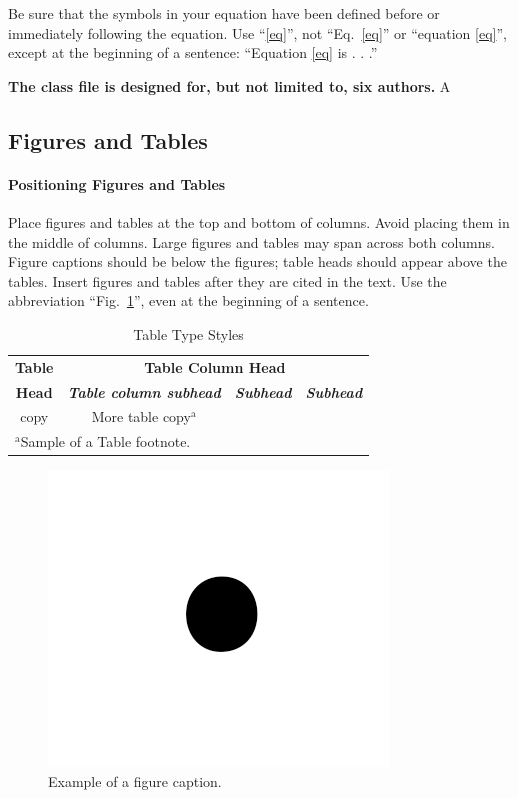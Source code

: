 \documentclass[conference]{IEEEtran}
\begin{document}
Be sure that the 
symbols in your equation have been defined before or immediately following 
the equation. Use ``\eqref{eq}'', not ``Eq.~\eqref{eq}'' or ``equation \eqref{eq}'', except at 
the beginning of a sentence: ``Equation \eqref{eq} is . . .''


\textbf{The class file is designed for, but not limited to, six authors.} A 

\subsection{Figures and Tables}
\paragraph{Positioning Figures and Tables} Place figures and tables at the top and 
bottom of columns. Avoid placing them in the middle of columns. Large 
figures and tables may span across both columns. Figure captions should be 
below the figures; table heads should appear above the tables. Insert 
figures and tables after they are cited in the text. Use the abbreviation 
``Fig.~\ref{fig}'', even at the beginning of a sentence.

\begin{table}[htbp]
\caption{Table Type Styles}
\begin{center}
\begin{tabular}{|c|c|c|c|}
\hline
\textbf{Table}&\multicolumn{3}{|c|}{\textbf{Table Column Head}} \\
\cline{2-4} 
\textbf{Head} & \textbf{\textit{Table column subhead}}& \textbf{\textit{Subhead}}& \textbf{\textit{Subhead}} \\
\hline
copy& More table copy$^{\mathrm{a}}$& &  \\
\hline
\multicolumn{4}{l}{$^{\mathrm{a}}$Sample of a Table footnote.}
\end{tabular}
\label{tab2}
\end{center}
\end{table}

\begin{figure}[htbp]
\centerline{\includegraphics{fig1.png}}
\caption{Example of a figure caption.}
\label{fig}
\end{figure}
\end{document}
